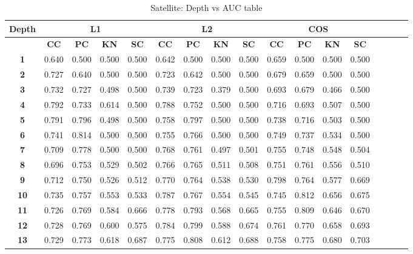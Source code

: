 \begin{table*}[!t]
\caption{Satellite: Depth vs AUC table}
\label{comparisons:satellite}
\centering
\begin{tabular}{|c|c|c|c|c|c|c|c|c|c|c|c|c|c|c|c|c|}
\hline
\bfseries Depth & \multicolumn{4}{c|}{\textbf{L1}} & \multicolumn{4}{c|}{\textbf{L2}} & \multicolumn{4}{c|}{\textbf{COS}} \\
\hline
\bfseries  & \bfseries CC & \bfseries PC & \bfseries KN & \bfseries SC & \bfseries CC & \bfseries PC & \bfseries KN & \bfseries SC & \bfseries CC & \bfseries PC & \bfseries KN & \bfseries SC \\
\hline
\bfseries 1 & 0.640 & 0.500 & 0.500 & 0.500 & 0.642 & 0.500 & 0.500 & 0.500 & 0.659 & 0.500 & 0.500 & 0.500 \\
\hline
\bfseries 2 & 0.727 & 0.640 & 0.500 & 0.500 & 0.723 & 0.642 & 0.500 & 0.500 & 0.679 & 0.659 & 0.500 & 0.500 \\
\hline
\bfseries 3 & 0.732 & 0.727 & 0.498 & 0.500 & 0.739 & 0.723 & 0.379 & 0.500 & 0.693 & 0.679 & 0.466 & 0.500 \\
\hline
\bfseries 4 & 0.792 & 0.733 & 0.614 & 0.500 & 0.788 & 0.752 & 0.500 & 0.500 & 0.716 & 0.693 & 0.507 & 0.500 \\
\hline
\bfseries 5 & 0.791 & 0.796 & 0.498 & 0.500 & 0.758 & 0.797 & 0.500 & 0.500 & 0.738 & 0.716 & 0.503 & 0.500 \\
\hline
\bfseries 6 & 0.741 & 0.814 & 0.500 & 0.500 & 0.755 & 0.766 & 0.500 & 0.500 & 0.749 & 0.737 & 0.534 & 0.500 \\
\hline
\bfseries 7 & 0.709 & 0.778 & 0.500 & 0.500 & 0.768 & 0.761 & 0.497 & 0.501 & 0.755 & 0.748 & 0.548 & 0.504 \\
\hline
\bfseries 8 & 0.696 & 0.753 & 0.529 & 0.502 & 0.766 & 0.765 & 0.511 & 0.508 & 0.751 & 0.761 & 0.556 & 0.510 \\
\hline
\bfseries 9 & 0.712 & 0.750 & 0.526 & 0.512 & 0.770 & 0.764 & 0.538 & 0.530 & 0.798 & 0.764 & 0.577 & 0.669 \\
\hline
\bfseries 10 & 0.735 & 0.757 & 0.553 & 0.533 & 0.787 & 0.767 & 0.554 & 0.545 & 0.745 & 0.812 & 0.656 & 0.675 \\
\hline
\bfseries 11 & 0.726 & 0.769 & 0.584 & 0.666 & 0.778 & 0.793 & 0.568 & 0.665 & 0.755 & 0.809 & 0.646 & 0.670 \\
\hline
\bfseries 12 & 0.728 & 0.769 & 0.600 & 0.575 & 0.784 & 0.799 & 0.588 & 0.674 & 0.761 & 0.770 & 0.658 & 0.693 \\
\hline
\bfseries 13 & 0.729 & 0.773 & 0.618 & 0.687 & 0.775 & 0.808 & 0.612 & 0.688 & 0.758 & 0.775 & 0.680 & 0.703 \\

\end{tabular}
\end{table*}

